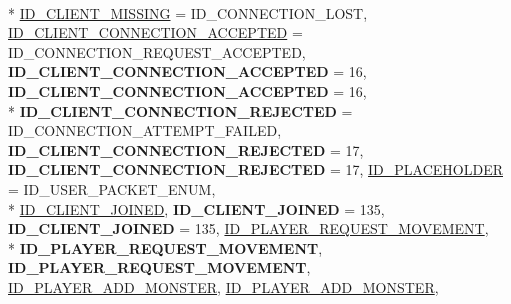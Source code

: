 \begin{DoxyCompactItemize}
\\*
\hyperlink{namespace_champ_net_plugin_a2ade5cfa7cf6c25ab7236c6b54a57821a31932f93b241ffddf903d32af0fc2155}{I\-D\-\_\-\-C\-L\-I\-E\-N\-T\-\_\-\-M\-I\-S\-S\-I\-N\-G} = I\-D\-\_\-\-C\-O\-N\-N\-E\-C\-T\-I\-O\-N\-\_\-\-L\-O\-S\-T, 
\hyperlink{namespace_champ_net_plugin_a2ade5cfa7cf6c25ab7236c6b54a57821a0295101371b4a70a1c007a4f6e206e1d}{I\-D\-\_\-\-C\-L\-I\-E\-N\-T\-\_\-\-C\-O\-N\-N\-E\-C\-T\-I\-O\-N\-\_\-\-A\-C\-C\-E\-P\-T\-E\-D} = I\-D\-\_\-\-C\-O\-N\-N\-E\-C\-T\-I\-O\-N\-\_\-\-R\-E\-Q\-U\-E\-S\-T\-\_\-\-A\-C\-C\-E\-P\-T\-E\-D, 
{\bfseries I\-D\-\_\-\-C\-L\-I\-E\-N\-T\-\_\-\-C\-O\-N\-N\-E\-C\-T\-I\-O\-N\-\_\-\-A\-C\-C\-E\-P\-T\-E\-D} = 16, 
{\bfseries I\-D\-\_\-\-C\-L\-I\-E\-N\-T\-\_\-\-C\-O\-N\-N\-E\-C\-T\-I\-O\-N\-\_\-\-A\-C\-C\-E\-P\-T\-E\-D} = 16, 
\\*
{\bfseries I\-D\-\_\-\-C\-L\-I\-E\-N\-T\-\_\-\-C\-O\-N\-N\-E\-C\-T\-I\-O\-N\-\_\-\-R\-E\-J\-E\-C\-T\-E\-D} = I\-D\-\_\-\-C\-O\-N\-N\-E\-C\-T\-I\-O\-N\-\_\-\-A\-T\-T\-E\-M\-P\-T\-\_\-\-F\-A\-I\-L\-E\-D, 
{\bfseries I\-D\-\_\-\-C\-L\-I\-E\-N\-T\-\_\-\-C\-O\-N\-N\-E\-C\-T\-I\-O\-N\-\_\-\-R\-E\-J\-E\-C\-T\-E\-D} = 17, 
{\bfseries I\-D\-\_\-\-C\-L\-I\-E\-N\-T\-\_\-\-C\-O\-N\-N\-E\-C\-T\-I\-O\-N\-\_\-\-R\-E\-J\-E\-C\-T\-E\-D} = 17, 
\hyperlink{namespace_champ_net_plugin_a2ade5cfa7cf6c25ab7236c6b54a57821a6acf78ef40fd50b2e823237ea828fc1b}{I\-D\-\_\-\-P\-L\-A\-C\-E\-H\-O\-L\-D\-E\-R} = I\-D\-\_\-\-U\-S\-E\-R\-\_\-\-P\-A\-C\-K\-E\-T\-\_\-\-E\-N\-U\-M, 
\\*
\hyperlink{namespace_champ_net_plugin_a2ade5cfa7cf6c25ab7236c6b54a57821aeb7ac0bb4cb955cc0b7a3bebc9f14774}{I\-D\-\_\-\-C\-L\-I\-E\-N\-T\-\_\-\-J\-O\-I\-N\-E\-D}, 
{\bfseries I\-D\-\_\-\-C\-L\-I\-E\-N\-T\-\_\-\-J\-O\-I\-N\-E\-D} = 135, 
{\bfseries I\-D\-\_\-\-C\-L\-I\-E\-N\-T\-\_\-\-J\-O\-I\-N\-E\-D} = 135, 
\hyperlink{namespace_champ_net_plugin_a2ade5cfa7cf6c25ab7236c6b54a57821abaa5b813ea0118cdccbb8f80d461fea8}{I\-D\-\_\-\-P\-L\-A\-Y\-E\-R\-\_\-\-R\-E\-Q\-U\-E\-S\-T\-\_\-\-M\-O\-V\-E\-M\-E\-N\-T}, 
\\*
{\bfseries I\-D\-\_\-\-P\-L\-A\-Y\-E\-R\-\_\-\-R\-E\-Q\-U\-E\-S\-T\-\_\-\-M\-O\-V\-E\-M\-E\-N\-T}, 
{\bfseries I\-D\-\_\-\-P\-L\-A\-Y\-E\-R\-\_\-\-R\-E\-Q\-U\-E\-S\-T\-\_\-\-M\-O\-V\-E\-M\-E\-N\-T}, 
\hyperlink{namespace_champ_net_plugin_a2ade5cfa7cf6c25ab7236c6b54a57821a942496ffc9e2a24c46c0bfd3f24460f6}{I\-D\-\_\-\-P\-L\-A\-Y\-E\-R\-\_\-\-A\-D\-D\-\_\-\-M\-O\-N\-S\-T\-E\-R}, 
\hyperlink{namespace_champ_net_plugin_a2ade5cfa7cf6c25ab7236c6b54a57821ad42c079bb7459dbaf419eeb2e845f3e2}{I\-D\-\_\-\-P\-L\-A\-Y\-E\-R\-\_\-\-A\-D\-D\-\_\-\-M\-O\-N\-S\-T\-E\-R}, 

\end{DoxyCompactItemize}
